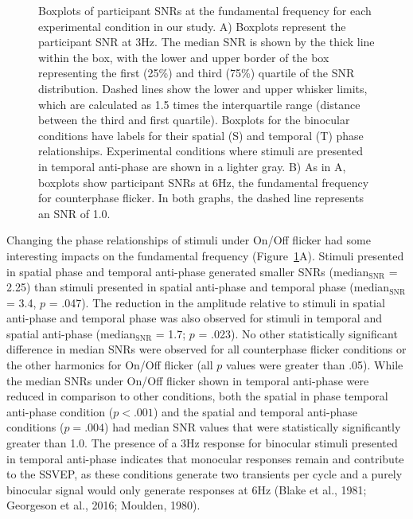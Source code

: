 \documentclass[
  12pt,
]{article}
\begin{document}
\begin{figure}


\caption{\label{fig-SNRComparison}Boxplots of participant SNRs at the
fundamental frequency for each experimental condition in our study. A)
Boxplots represent the participant SNR at 3Hz. The median SNR is shown
by the thick line within the box, with the lower and upper border of the
box representing the first (25\%) and third (75\%) quartile of the SNR
distribution. Dashed lines show the lower and upper whisker limits,
which are calculated as 1.5 times the interquartile range (distance
between the third and first quartile). Boxplots for the binocular
conditions have labels for their spatial (S) and temporal (T) phase
relationships. Experimental conditions where stimuli are presented in
temporal anti-phase are shown in a lighter gray. B) As in A, boxplots
show participant SNRs at 6Hz, the fundamental frequency for counterphase
flicker. In both graphs, the dashed line represents an SNR of 1.0.}

\end{figure}%

Changing the phase relationships of stimuli under On/Off flicker had
some interesting impacts on the fundamental frequency
(Figure~\ref{fig-SNRComparison}A). Stimuli presented in spatial phase
and temporal anti-phase generated smaller SNRs (median\(_{\text{SNR}}\)
= 2.25) than stimuli presented in spatial anti-phase and temporal phase
(median\(_\text{SNR}\) = 3.4, \(p\) = .047). The reduction in the
amplitude relative to stimuli in spatial anti-phase and temporal phase
was also observed for stimuli in temporal and spatial anti-phase
(median\(_\text{SNR}\) = 1.7; \(p\) = .023). No other statistically
significant difference in median SNRs were observed for all counterphase
flicker conditions or the other harmonics for On/Off flicker (all \(p\)
values were greater than .05). While the median SNRs under On/Off
flicker shown in temporal anti-phase were reduced in comparison to other
conditions, both the spatial in phase temporal anti-phase condition
(\(p < .001\)) and the spatial and temporal anti-phase conditions
(\(p = .004\)) had median SNR values that were statistically
significantly greater than 1.0. The presence of a 3Hz response for
binocular stimuli presented in temporal anti-phase indicates that
monocular responses remain and contribute to the SSVEP, as these
conditions generate two transients per cycle and a purely binocular
signal would only generate responses at 6Hz (Blake et al., 1981;
Georgeson et al., 2016; Moulden, 1980).
\end{document}
